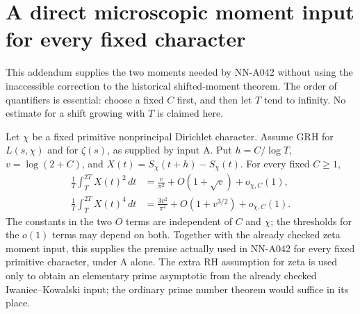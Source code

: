 \section{A direct microscopic moment input for every fixed character}
\label{sec:A042-direct-moments}

This addendum supplies the two moments needed by NN-A042 without
using the inaccessible correction to the historical shifted-moment
theorem. The order of quantifiers is essential: choose a fixed $C$
first, and then let $T$ tend to infinity. No estimate for a shift
growing with $T$ is claimed here.

\begin{theorem}
\label{thm:A042-direct-moments}
Let $\chi$ be a fixed primitive nonprincipal Dirichlet character.
Assume GRH for $L(s,\chi)$ and for $\zeta(s)$, as supplied by input A.
Put $h=C/\log T$, $v=\log(2+C)$, and
$X(t)=S_\chi(t+h)-S_\chi(t)$. For every fixed $C\ge1$,
\begin{align}\label{eq:A042-direct-moment-result}
 \frac1T\int_T^{2T}X(t)^2\,dt
   &=\frac{v}{\pi^2}+O(1+\sqrt v)+o_{\chi,C}(1),\\
 \frac1T\int_T^{2T}X(t)^4\,dt
   &=\frac{3v^2}{\pi^4}+O(1+v^{3/2})+o_{\chi,C}(1).
 \nonumber
\end{align}
The constants in the two $O$ terms are independent of $C$ and
$\chi$; the thresholds for the $o(1)$ terms may depend on both.
Together with the already checked zeta moment input, this supplies
the premise actually used in NN-A042 for every fixed primitive
character, under A alone. The extra RH assumption for zeta is used
only to obtain an elementary prime asymptotic from the already
checked Iwaniec--Kowalski input; the ordinary prime number theorem
would suffice in its place.
\end{theorem}

